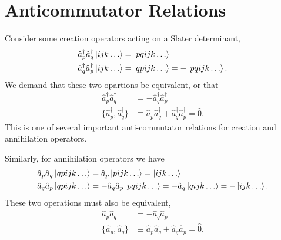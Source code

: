 \section{Anticommutator Relations}

    Consider some creation operators acting on a Slater determinant,
    \begin{equation}
        \begin{aligned}
            \hat{a}_p^\dagger \hat{a}_q^\dagger \ket{ijk \dots} &= \ket{pqijk \dots} \\
            \hat{a}_q^\dagger \hat{a}_p^\dagger \ket{ijk \dots} &= \ket{qpijk \dots}
                = - \ket{pqijk \dots}.
        \end{aligned}
    \end{equation}
    We demand that these two opartions be equivalent, or that 
    \begin{equation}
        \begin{aligned}
            \hat{a}_p^\dagger \hat{a}_q^\dagger &= 
                -\hat{a}_q^\dagger \hat{a}_p^\dagger \\
            \{\hat{a}_p^\dagger, \hat{a}_q^\dagger\} &\equiv 
                \hat{a}_p^\dagger \hat{a}_q^\dagger + 
                \hat{a}_q^\dagger \hat{a}_p^\dagger = \hat{0}.
        \end{aligned}
    \end{equation}
    This is one of several important anti-commutator relations for creation and
    annihilation operators.

    Similarly, for annihilation operators we have
    \begin{equation}
        \begin{aligned}
            \hat{a}_p \hat{a}_q \ket{qpijk \dots} &= 
                \hat{a}_p\ket{pijk \dots} = \ket{ijk \dots} \\
            \hat{a}_q \hat{a}_p \ket{qpijk \dots} &= 
                - \hat{a}_q \hat{a}_p \ket{pqijk \dots} = 
                - \hat{a}_q \ket{qijk \dots} = - \ket{ijk \dots}.
        \end{aligned}
    \end{equation}
    These two operations must also be equivalent, 
    \begin{equation}
        \begin{aligned}
            \hat{a}_p \hat{a}_q &= 
                -\hat{a}_q \hat{a}_p \\
            \{\hat{a}_p, \hat{a}_q\} &\equiv 
                \hat{a}_p \hat{a}_q + 
                \hat{a}_q \hat{a}_p = \hat{0}.
        \end{aligned}
    \end{equation}

